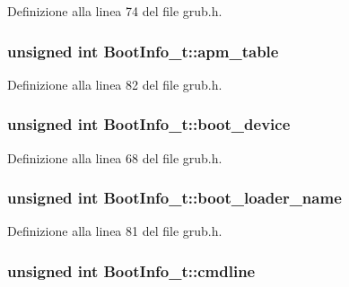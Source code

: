 Definizione alla linea 74 del file grub.\+h.

\hypertarget{structBootInfo__t_a1ce55d9a9d425ccbc6c447a8d73ffdba}{
\subsubsection[{apm\+\_\+table}]{\setlength{\rightskip}{0pt plus 5cm}unsigned int Boot\+Info\+\_\+t\+::apm\+\_\+table}}\label{structBootInfo__t_a1ce55d9a9d425ccbc6c447a8d73ffdba}


Definizione alla linea 82 del file grub.\+h.

\hypertarget{structBootInfo__t_a11fa989df3074f1a90fcb646aa434b97}{
\subsubsection[{boot\+\_\+device}]{\setlength{\rightskip}{0pt plus 5cm}unsigned int Boot\+Info\+\_\+t\+::boot\+\_\+device}}\label{structBootInfo__t_a11fa989df3074f1a90fcb646aa434b97}


Definizione alla linea 68 del file grub.\+h.

\hypertarget{structBootInfo__t_a49973d2d24c8f4159b125f2fe0a42e3d}{
\subsubsection[{boot\+\_\+loader\+\_\+name}]{\setlength{\rightskip}{0pt plus 5cm}unsigned int Boot\+Info\+\_\+t\+::boot\+\_\+loader\+\_\+name}}\label{structBootInfo__t_a49973d2d24c8f4159b125f2fe0a42e3d}


Definizione alla linea 81 del file grub.\+h.

\hypertarget{structBootInfo__t_a23d97e399056fd818fdd31ceb1a07f42}{
\subsubsection[{cmdline}]{\setlength{\rightskip}{0pt plus 5cm}unsigned int Boot\+Info\+\_\+t\+::cmdline}}\label{structBootInfo__t_a23d97e399056fd818fdd31ceb1a07f42}


